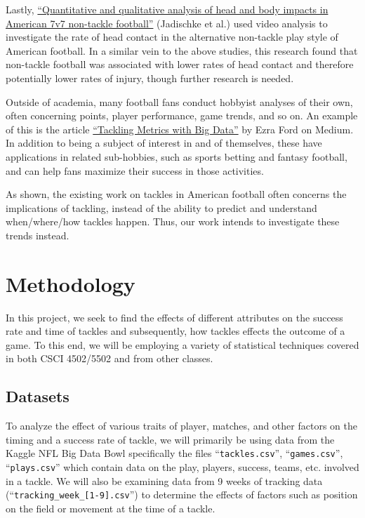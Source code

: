 \documentclass[bibtex, sigconf, hyperref={colorlinks=true,linkcolor=blue,urlcolor=blue}]{acmart}
\begin{document}
Lastly,
\href{https://bmjopensem.bmj.com/content/6/1/e000638.abstract}{“Quantitative and
qualitative analysis of head and body impacts in American 7v7 non-tackle
football”}\cite{quantitative} (Jadischke et al.) used video analysis to
investigate the rate of head contact in the alternative non-tackle play style of
American football. In a similar vein to the above studies, this research found
that non-tackle football was associated with lower rates of head contact and
therefore potentially lower rates of injury, though further research is needed.

Outside of academia, many football fans conduct hobbyist analyses of their own,
often concerning points, player performance, game trends, and so on. An example
of this is the article
\href{https://medium.com/@ezra.ford/tackling-metrics-with-big-data-0812b5ab65f0}{“Tackling
Metrics with Big Data”}\cite{mediummetrics} by Ezra Ford on Medium. In addition to being a subject
of interest in and of themselves, these have applications in related
sub-hobbies, such as sports betting and fantasy football, and can help fans
maximize their success in those activities.

As shown, the existing work on tackles in American football often concerns the
implications of tackling, instead of the ability to predict and understand
when/where/how tackles happen.  Thus, our work intends to investigate these
trends instead.

\section{Methodology}

In this project, we seek to find the effects of different attributes on the
success rate and time of tackles and subsequently, how tackles effects the
outcome of a game.  To this end, we will be employing a variety of statistical
techniques covered in both CSCI 4502/5502 and from other classes.

\subsection{Datasets}

To analyze the effect of various traits of player, matches, and other factors
on the timing and a success rate of tackle, we will primarily be using data
from the Kaggle NFL Big Data Bowl \cite{nflkaggle}
specifically the files ``\verb|tackles.csv|'', ``\verb|games.csv|'',
``\verb|plays.csv|'' which contain data on the play, players, success, teams,
etc. involved in a tackle.  We will also be examining data from 9 weeks of
tracking data (``\verb|tracking_week_[1-9].csv|'') to determine the effects of
factors such as position on the field or movement at the time of a tackle.
\end{document}
